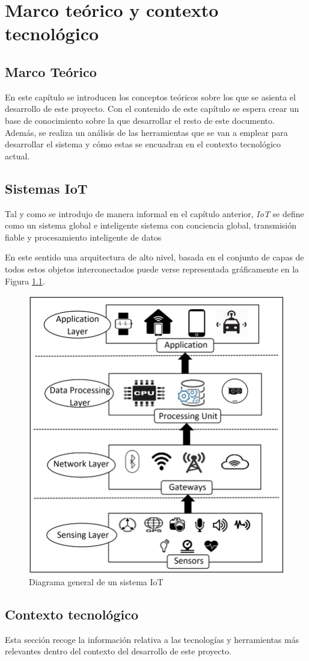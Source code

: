 \chapter{Marco teórico y contexto tecnológico}
\label{chapter:background}

\section{Marco Teórico}

En este capítulo se introducen los conceptos teóricos sobre los que se asienta el desarrollo de este proyecto. Con el contenido de este capítulo se espera
crear un base de conocimiento sobre la que desarrollar el resto de este documento. Además, se realiza un análisis de las herramientas que se van a emplear para desarrollar el sistema y cómo estas se encuadran en el contexto tecnológico actual.

\section{Sistemas IoT}

Tal y como se introdujo de manera informal en el capítulo anterior, \textit{IoT} se define como un sistema global e inteligente
sistema con conciencia global, transmisión fiable
y procesamiento inteligente de datos %

En este sentido una arquitectura de alto nivel, basada en el conjunto de capas de todos estos objetos interconectados puede verse representada gráficamente en la Figura \ref{fig:IoT_General}.

\begin{figure}[H]
  \centering
  \includegraphics[width=0.7\linewidth]{figures/IoT-Architecture-Layers-and-Components.png}
  \caption{Diagrama general de un sistema IoT}
  \label{fig:IoT_General}
\end{figure}


\section{Contexto tecnológico}

Esta sección recoge la información relativa a las tecnologías y herramientas más relevantes dentro del contexto del desarrollo de este proyecto.

